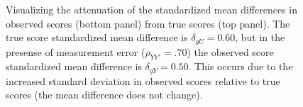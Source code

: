 \documentclass[
  letterpaper,
  DIV=11,
  numbers=noendperiod]{scrreprt}
\begin{document}
\begin{figure}[H]


\caption{\label{fig-d-attenuation}Visualizing the attenuation of the
standardized mean differences in observed scores (bottom panel) from
true scores (top panel). The true score standardized mean difference is
\(\delta_{gU}=0.60\), but in the presense of measurement error
(\(\rho_{YY'}=.70\)) the observed score standardized mean difference is
\(\delta_{gY}=0.50\). This occurs due to the increased standard
deviation in observed scores relative to true scores (the mean
difference does not change).}

\end{figure}%
\end{document}
